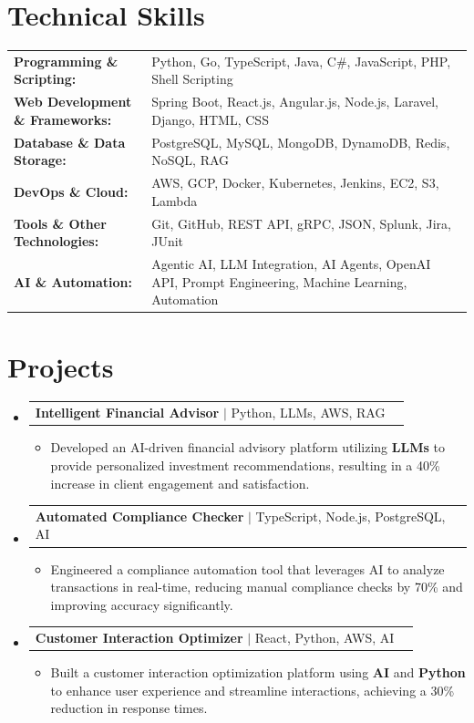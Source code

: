 \documentclass[letterpaper,10pt]{article}
\makeatletter
\newcommand{\resumeItem}[1]{
  \item{\fontsize{8pt}{9pt}\selectfont
    #1 \vspace{-3pt}
  }
}
\newcommand{\resumeProjectHeading}[2]{
    \item
    \begin{tabular*}{1.001\textwidth}{l@{\extracolsep{\fill}}r}
      \fontsize{8.5pt}{10pt}#1 & \textbf{\fontsize{8.5pt}{10pt} #2}\\
    \end{tabular*}\vspace{-7pt}
}
\newcommand{\resumeSubHeadingListStart}{\begin{itemize}[leftmargin=0pt, label={}]}
\newcommand{\resumeSubHeadingListEnd}{\end{itemize}}
\newcommand{\resumeItemListStart}{\begin{itemize}[leftmargin=*]}
\newcommand{\resumeItemListEnd}{\end{itemize}\vspace{-5pt}}
\makeatother
\begin{document}
\section{Technical Skills}
        \vspace{-14pt}
        \begin{table}[h]
            \fontsize{8pt}{9pt}\selectfont
            \begin{tabular}{p{0.3\linewidth} p{0.7\linewidth}}
                \textbf{Programming \& Scripting:} & Python, Go, TypeScript, Java, C\#, JavaScript, PHP, Shell Scripting \\
                \textbf{Web Development \& Frameworks:} & Spring Boot, React.js, Angular.js, Node.js, Laravel, Django, HTML, CSS \\
                \textbf{Database \& Data Storage:} & PostgreSQL, MySQL, MongoDB, DynamoDB, Redis, NoSQL, RAG \\
                \textbf{DevOps \& Cloud:} & AWS, GCP, Docker, Kubernetes, Jenkins, EC2, S3, Lambda \\
                \textbf{Tools \& Other Technologies:} & Git, GitHub, REST API, gRPC, JSON, Splunk, Jira, JUnit \\
                \textbf{AI \& Automation:} & Agentic AI, LLM Integration, AI Agents, OpenAI API, Prompt Engineering, Machine Learning, Automation \\
            \end{tabular}
        \end{table}
 \vspace{-18pt}

\section{Projects}
    \vspace{-5pt}
    \resumeSubHeadingListStart
          \resumeProjectHeading
            {\textbf{Intelligent Financial Advisor} $|$ Python, LLMs, AWS, RAG}{}
            \resumeItemListStart
                \resumeItem{Developed an AI-driven financial advisory platform utilizing \textbf{LLMs} to provide personalized investment recommendations, resulting in a 40\% increase in client engagement and satisfaction.}
            \resumeItemListEnd
        \vspace{-12pt}
    
        \resumeProjectHeading
            {\textbf{Automated Compliance Checker} $|$ TypeScript, Node.js, PostgreSQL, AI}{}
        \resumeItemListStart
                \resumeItem{Engineered a compliance automation tool that leverages AI to analyze transactions in real-time, reducing manual compliance checks by 70\% and improving accuracy significantly.}
        \resumeItemListEnd
      \vspace{-12pt}
      \resumeProjectHeading
        {\textbf{Customer Interaction Optimizer} $|$ React, Python, AWS, AI}{}
    \resumeItemListStart
            \resumeItem{Built a customer interaction optimization platform using \textbf{AI} and \textbf{Python} to enhance user experience and streamline interactions, achieving a 30\% reduction in response times.}
    \resumeItemListEnd
    \resumeSubHeadingListEnd
\end{document}
